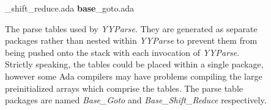\_shift\_reduce.ada  {\bf base}\_goto.ada

\indent The parse tables used by {\it YYParse}.  They are generated as separate\\
\indent  packages rather than nested within {\it YYParse}
to prevent them from \\
 \indent being pushed onto the stack with each invocation of {\it YYParse}.\\
\indent Strictly speaking, the tables could be placed within a single
package,\\
\indent however some Ada compilers may have problems
compiling the large\\
\indent  preinitialized arrays which comprise the tables.  The
parse table\\
\indent packages are named {\it Base\_Goto} and
{\it Base\_Shift\_Reduce} respectively.\\
